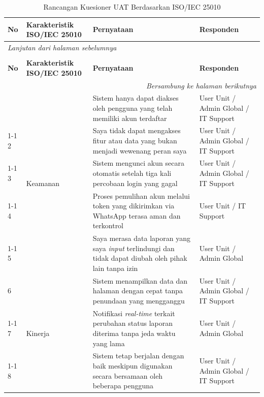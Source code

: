 \begin{longtable}{|p{}|p{}|p{}|p{}|}
    \caption{Rancangan Kuesioner UAT Berdasarkan ISO/IEC 25010}
    \label{table:3.uat}\\
    \hline
    \textbf{No} & \textbf{Karakteristik ISO/IEC 25010} & \textbf{Pernyataan} & \textbf{Responden} \\
    \hline
    \endfirsthead
    \multicolumn{4}{l}{\textit{Lanjutan dari halaman sebelumnya}} \\
    \caption[]{Rancangan Kuesioner UAT Berdasarkan ISO/IEC 25010} \\
    \hline
    \textbf{No} & \textbf{Karakteristik ISO/IEC 25010} & \textbf{Pernyataan} & \textbf{Responden} \\
    \hline
    \endhead
    \hline
    \multicolumn{4}{r}{\textit{Bersambung ke halaman berikutnya}} \\
    \endfoot
    \endlastfoot
    1 & \multirow{5}{=}{Keamanan} & Sistem hanya dapat diakses oleh pengguna yang telah memiliki akun terdaftar & User Unit / Admin Global / IT Support \\
    \cline{1-1}\cline{3-4}
    2 & & Saya tidak dapat mengakses fitur atau data yang bukan menjadi wewenang peran saya & User Unit / Admin Global / IT Support \\
    \cline{1-1}\cline{3-4}
    3 & & Sistem mengunci akun secara otomatis setelah tiga kali percobaan login yang gagal & User Unit / Admin Global / IT Support \\
    \cline{1-1}\cline{3-4}
    4 & & Proses pemulihan akun melalui token yang dikirimkan via WhatsApp terasa aman dan terkontrol & User Unit / IT Support \\
    \cline{1-1}\cline{3-4}
    5 & & Saya merasa data laporan yang saya \textit{input} terlindungi dan tidak dapat diubah oleh pihak lain tanpa izin & User Unit / Admin Global \\
    \hline
    6 & \multirow{4}{=}{Kinerja} & Sistem menampilkan data dan halaman dengan cepat tanpa penundaan yang mengganggu & User Unit / Admin Global / IT Support \\
    \cline{1-1}\cline{3-4}
    7 & & Notifikasi \textit{real-time} terkait perubahan status laporan diterima tanpa jeda waktu yang lama & User Unit / Admin Global \\
    \cline{1-1}\cline{3-4}
    8 & & Sistem tetap berjalan dengan baik meskipun digunakan secara bersamaan oleh beberapa pengguna & User Unit / Admin Global / IT Support \\

\end{longtable}
